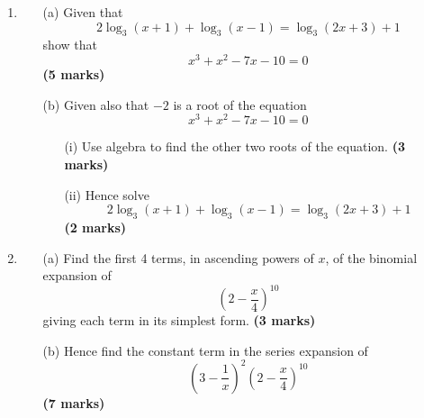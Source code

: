 \documentclass{../Templates/sbs-exam}
\newcommand{\imarks}[1]{\hfill \textbf{(#1 marks)}}
\begin{document}
\begin{enumerate}
\begin{enumerate}
    \item[(b)] Hence find an equation of \( C \). \imarks{2}
    
    \item[(c)] Find an equation of the tangent to \( C \) at the point \( Q \), giving your answer in the form \( ax + by + c = 0 \) where \( a \), \( b \) and \( c \) are integers to be found. \imarks{3}
\end{enumerate}

\vspace{7cm}

\item %


\begin{enumerate}
    \item[(a)] Given that
    \[
    2\log_3(x + 1) + \log_3(x - 1) = \log_3(2x + 3) + 1
    \]
    show that
    \[
    x^3 + x^2 - 7x - 10 = 0
    \] \imarks{5}

    \item[(b)] Given also that \(-2\) is a root of the equation
    \[
    x^3 + x^2 - 7x - 10 = 0
    \]
    \begin{enumerate}
        \item[(i)] Use algebra to find the other two roots of the equation. \vspace{0.5cm} \imarks{3}
        \item[(ii)] Hence solve
        \[
        2\log_3(x + 1) + \log_3(x - 1) = \log_3(2x + 3) + 1
        \] \imarks{2}
    \end{enumerate}
\end{enumerate}

\vspace{10cm}

\item %
\begin{enumerate}
    \item[(a)] Find the first 4 terms, in ascending powers of $x$, of the binomial expansion of 
    \[
    \left(2 - \frac{x}{4}\right)^{10}
    \]
    giving each term in its simplest form. \imarks{3}

    \item[(b)] Hence find the constant term in the series expansion of 
    \[
    \left(3 - \frac{1}{x}\right)^2 \left(2 - \frac{x}{4}\right)^{10}
    \] \imarks{7}
\end{enumerate}

\end{enumerate}
\end{document}
